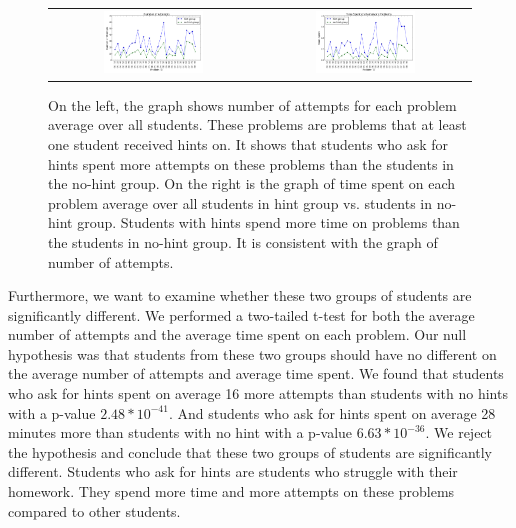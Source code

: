 \documentclass{llncs}
\begin{document}
\begin{figure}[ht]
\centering
   \begin{tabular}{c c}
		\includegraphics[width=0.5\textwidth]{image/tries_analysis.png} &
		\includegraphics[width=0.5\textwidth]{image/times_analysis.png}
	\end{tabular}
    \caption{On the left, the graph shows number of attempts for each problem average over all students. These problems are problems that at least one student received hints on. It shows that students who ask for hints spent more attempts on these problems than the students in the no-hint group. On the right is the graph of time spent on each problem average over all students in hint group vs. students in no-hint group. Students with hints spend more time on problems than the students in no-hint group. It is consistent with the graph of number of attempts.}
    \label{fig:tries_times_analysis}
\end{figure}

Furthermore, we want to examine whether these two groups of students are significantly different. We performed a two-tailed t-test for both the average number of attempts and the average time spent on each problem. Our null hypothesis was that students from these two groups should have no different on the average number of attempts and average time spent. We found that students who ask for hints spent on average 16 more attempts than students with no hints with a p-value $2.48*10^{-41}$. And students who ask for hints spent on average 28 minutes more than students with no hint with a p-value $6.63*10^{-36}$. We reject the hypothesis and conclude that these two groups of students are significantly different. Students who ask for hints are students who struggle with their homework. They spend more time and more attempts on these problems compared to other students.
\end{document}
